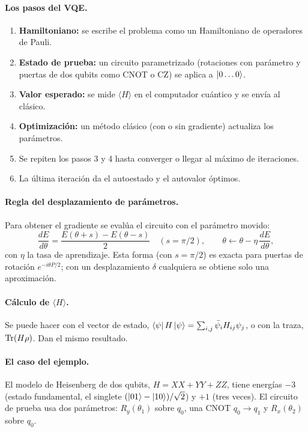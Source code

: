 \paragraph{Los pasos del VQE.}
\begin{enumerate}
  \item \textbf{Hamiltoniano:} se escribe el problema como un Hamiltoniano de
    operadores de Pauli.
  \item \textbf{Estado de prueba:} un circuito parametrizado (rotaciones con
    parámetro y puertas de dos qubits como CNOT o CZ) se aplica a $\left|0\ldots0\right\rangle$.
  \item \textbf{Valor esperado:} se mide $\langle H\rangle$ en el computador
    cuántico y se envía al clásico.
  \item \textbf{Optimización:} un método clásico (con o sin gradiente) actualiza
    los parámetros.
  \item Se repiten los pasos 3 y 4 hasta converger o llegar al máximo de iteraciones.
  \item La última iteración da el autoestado y el autovalor óptimos.
\end{enumerate}

\paragraph{Regla del desplazamiento de parámetros.} Para obtener el gradiente
se evalúa el circuito con el parámetro movido:
\begin{equation}
  \frac{dE}{d\theta}=\frac{E(\theta+s)-E(\theta-s)}{2}\quad(s=\pi/2),
  \qquad \theta\leftarrow\theta-\eta\,\frac{dE}{d\theta},
\end{equation}
con $\eta$ la tasa de aprendizaje. Esta forma (con $s=\pi/2$) es exacta para
puertas de rotación $e^{-i\theta P/2}$; con un desplazamiento $\delta$ cualquiera
se obtiene solo una aproximación.

\paragraph{Cálculo de $\langle H\rangle$.} Se puede hacer con el vector de estado,
$\left\langle\psi\right| H\left|\psi\right\rangle=\sum_{i,j}\bar\psi_iH_{ij}\psi_j$, o con la traza,
$\operatorname{Tr}(H\rho)$. Dan el mismo resultado.

\paragraph{El caso del ejemplo.} El modelo de Heisenberg de dos qubits,
$H=XX+YY+ZZ$, tiene energías $-3$ (estado fundamental, el singlete
$(\left|01\right\rangle-\left|10\right\rangle)/\sqrt2$) y $+1$ (tres veces). El circuito de prueba usa
dos parámetros: $R_y(\theta_1)$ sobre $q_0$, una CNOT $q_0\to q_1$ y
$R_x(\theta_2)$ sobre $q_0$.

